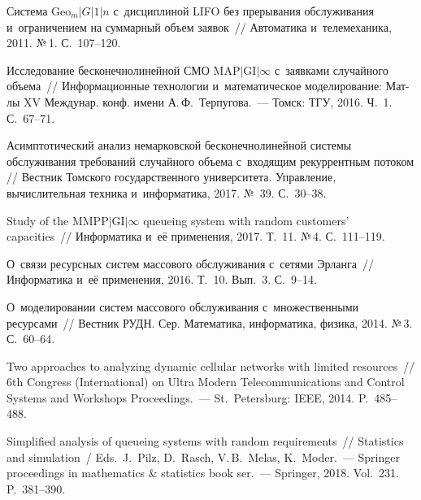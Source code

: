 \begin{multicols}{2}
{{\begin{thebibliography}{99}
Сис\-те\-ма $\mathrm{Geo}_m|G|1|n$ с~дисциплиной LIFO без прерывания обслуживания 
и~ограничением на суммарный объем заявок~// {Автоматика и~телемеханика}, 2011. 
№\,1. С.~107--120.

Исследование бесконечнолинейной СМО $\mathrm{MAP}|\mathrm{GI}|\infty$ с~заявками случайного объема~// 
{Информационные технологии и~математическое моделирование: 
Мат-лы XV Междунар. конф. имени А.\,Ф.~Терпугова}.~--- Томск: ТГУ, 
2016. Ч.~1. С.~67--71.

Асимптотический анализ немарковской бесконечнолинейной сис\-те\-мы обслуживания 
требований случайного объема с~входящим рекуррентным потоком // {Вестник 
Томского государственного университета. Управление, вычислительная техника 
и~информатика}, 2017. №~39. С.~30--38.

Study of the $\mathrm{MMPP}|\mathrm{GI}|\infty$ queueing system with 
random customers' capacities~// 
{Информатика 
и~её применения}, 2017. Т.~11. №\,4. С.~111--119.



О~связи ресурсных сис\-тем массового обслуживания с~сетями Эрланга~// {Информатика 
и~её применения}, 2016. Т.~10. Вып.~3. С.~9--14.

О~моделировании сис\-тем массового обслуживания с~множественными ресурсами~// 
{Вестник РУДН. Сер. Математика, информатика, физика}, 2014. №\,3. С.~60--64.

Two approaches to analyzing dynamic cellular networks with limited resources~// 
{6th  Congress (International) on Ultra Modern Telecommunications and Control 
Systems and Workshops Proceedings}.~--- St.\ Petersburg: IEEE, 
2014. P.~485--488.

Simplified analysis of queueing systems with random requirements~// {Statistics and
simulation}~/
Eds.\ J.~Pilz, D.~Rasch, V.\,B.~Melas, K.~Moder.~---
Springer proceedings in mathematics \& statistics book ser.~---
Springer, 2018. Vol.~231. P.~381--390.


\end{thebibliography}}}
\end{multicols}
